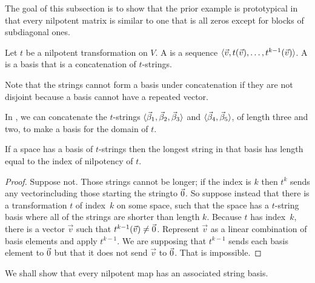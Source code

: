 The goal of this subsection is to show
that the prior example is prototypical
in that every nilpotent matrix is similar to one that is all
zeros except for blocks of subdiagonal ones.

\begin{definition}
Let \( t \) be a nilpotent transformation on \( V \).
A 
is a sequence
\( \langle\vec{v},t(\vec{v}),\ldots,t^{k-1}(\vec{v})\rangle \).
A 
is a basis that is a concatenation of \( t \)-strings.
\end{definition}

Note that the strings cannot form a basis under concatenation
if they are not disjoint because a basis cannot have a repeated vector. 

\begin{example}
In , we can concatenate the $t$-strings
$\langle\vec{\beta}_1,\vec{\beta}_2,\vec{\beta}_3\rangle$ and
$\langle\vec{\beta}_4,\vec{\beta}_5\rangle$, of length three and two,
to make a basis for the domain of $t$.
\end{example}

\begin{lemma}  \label{le:LongestTowerIsIndex}
If a space has a basis of \( t \)-strings then the longest string in that
basis has 
length equal to the index of nilpotency of $t$.
\end{lemma}

\begin{proof}
Suppose not.
Those strings cannot be longer; if the index is
\( k \) then \( t^k \) sends any vector\Dash including those starting the
string\Dash to \( \vec{0} \).
So suppose instead that there is a transformation $t$ of index~$k$ 
on some space, such that the space has a $t$-string basis where 
all of the strings are shorter than length \( k \).
Because $t$ has index~$k$, there is a vector \( \vec{v} \) 
such that \( t^{k-1}(\vec{v})\neq\vec{0} \).
Represent $\vec{v}$ as a linear combination of basis elements 
and apply \( t^{k-1} \).
We are supposing that \( t^{k-1} \) sends each basis element to \( \vec{0} \)
but that it does not send \( \vec{v} \) to \( \vec{0} \).
That is impossible. 
\end{proof}

We shall show that every
nilpotent map has an associated string basis.

